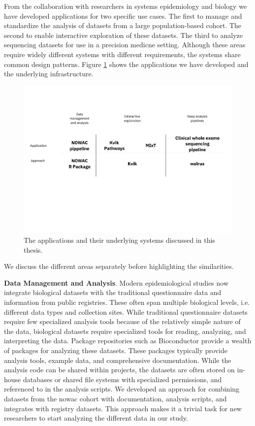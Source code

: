 From the collaboration with researchers in systems epidemiology and biology we
have developed applications for two specific use cases. The first to manage and
standardize the analysis of datasets from a large population-based cohort.  The
second to enable interactive exploration of these datasets.  The third to
analyze sequencing datasets for use in a precision medicne setting. Although
these areas require widely different systems with different requirements, the
systems share common design patterns.  Figure \ref{overview-fig} shows the
applications we have developed and the underlying infrastructure. 

\begin{figure}
\includegraphics[width=\textwidth]{figures/overall-arch.pdf}
    \caption{The applications and their underlying systems discussed in this
    thesis. } 
    \label{overview-fig}
\end{figure} 

We discuss the different areas separately before highlighting the similarities. 

\textbf{Data Management and Analysis}. 
Modern epidemiological studies now integrate biological datasets with the
traditional questionnaire data and information from public registries.  These
often span multiple biological levels, i.e. different data types and collection
sites. While traditional questionnaire datasets require few specialized
analysis tools because of the relatively simple nature of the data, biological
datasets require specialized tools for reading, analyzing, and interpreting the
data. Package repositories such as Bioconductor provide a wealth of packages for
analyzing these datasets. These packages typically provide analysis tools,
example data, and comprehensive documentation. While the analysis code can be
shared within projects, the datasets are often stored on in-house databases or
shared file systems with specialized permissions, and referenced to in the
analysis scripts. We developed an approach for combining datasets from the
\gls{nowac} cohort with documentation, analysis scripts, and integrates with
registry datasets. This approach makes it a trivial task for new researchers to
start analyzing the different data in our study. 

